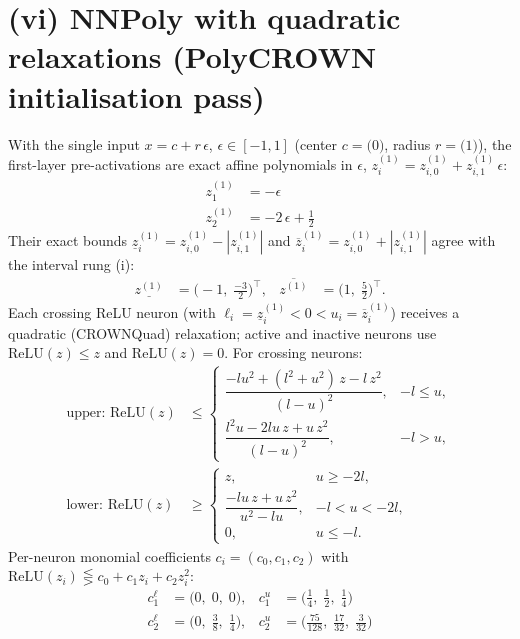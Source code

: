 \documentclass[11pt]{article}
\begin{document}
\section{(vi) NNPoly with quadratic relaxations (PolyCROWN initialisation pass)}
With the single input $x = c + r\,\epsilon$, $\epsilon \in [-1, 1]$ (center $c = \bigl(0\bigr)$, radius $r = \bigl(1\bigr)$), the first-layer pre-activations are exact affine polynomials in $\epsilon$, $z^{(1)}_i = z^{(1)}_{i,0} + z^{(1)}_{i,1}\,\epsilon$:
\begin{align*}
z^{(1)}_{1} &= -\epsilon \\
z^{(1)}_{2} &= -2\,\epsilon + \frac{1}{2}
\end{align*}
Their exact bounds $\underline{z}^{(1)}_i = z^{(1)}_{i,0} - |z^{(1)}_{i,1}|$ and $\overline{z}^{(1)}_i = z^{(1)}_{i,0} + |z^{(1)}_{i,1}|$ agree with the interval rung (i):
\begin{align*}
\underline{z^{(1)}} &= \bigl(-1,\; \frac{-3}{2}\bigr)^{\!\top}, & \overline{z^{(1)}} &= \bigl(1,\; \frac{5}{2}\bigr)^{\!\top}.
\end{align*}
Each crossing ReLU neuron (with $\ell_i = \underline{z}^{(1)}_i < 0 < u_i = \overline{z}^{(1)}_i$)
receives a quadratic (CROWNQuad) relaxation; active and inactive neurons use $\mathrm{ReLU}(z) \le z$
and $\mathrm{ReLU}(z) = 0$. For crossing neurons:
\begin{align*}
\text{upper: } \mathrm{ReLU}(z) &\le \begin{cases} \dfrac{-l u^2 + (l^2 + u^2)\, z - l\, z^2}{(l - u)^2}, & -l \le u, \\[3mm] \dfrac{l^2 u - 2 l u\, z + u\, z^2}{(l - u)^2}, & -l > u, \end{cases} \\[2mm]
\text{lower: } \mathrm{ReLU}(z) &\ge \begin{cases} z, & u \ge -2l, \\[3mm] \dfrac{-l u\, z + u\, z^2}{u^2 - l u}, & -l < u < -2l, \\[3mm] 0, & u \le -l. \end{cases}
\end{align*}
Per-neuron monomial coefficients $c_i = (c_0, c_1, c_2)$ with $\mathrm{ReLU}(z_i) \lesseqgtr c_0 + c_1 z_i + c_2 z_i^2$:
\begin{align*}
c^{\ell}_{1} &= \bigl(0,\; 0,\; 0\bigr), & c^{u}_{1} &= \bigl(\frac{1}{4},\; \frac{1}{2},\; \frac{1}{4}\bigr) \\
c^{\ell}_{2} &= \bigl(0,\; \frac{3}{8},\; \frac{1}{4}\bigr), & c^{u}_{2} &= \bigl(\frac{75}{128},\; \frac{17}{32},\; \frac{3}{32}\bigr)
\end{align*}
\end{document}
